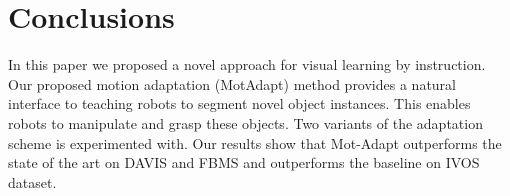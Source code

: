 \documentclass[letterpaper, 10 pt, conference]{ieeeconf}
\begin{document}
\section{Conclusions}
In this paper we proposed a novel approach for visual learning by instruction. Our proposed motion adaptation (MotAdapt) method provides a natural interface to teaching robots to segment novel object instances. This enables robots to manipulate and grasp these objects. Two variants of the adaptation scheme is experimented with. Our results show that Mot-Adapt outperforms the state of the art on DAVIS and FBMS and outperforms the baseline on IVOS dataset. 
{\small


}
\end{document}
